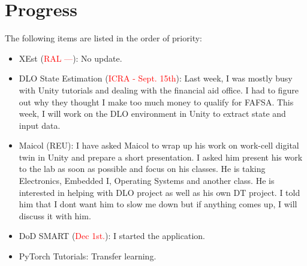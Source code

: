 \documentclass[11pt]{article}
\begin{document}
\section{Progress}
The following items are listed in the order of priority:
\begin{itemize}
    \item XEst (\textcolor{red}{RAL ---}): No update.


    \item DLO State Estimation (\textcolor{red}{ICRA - Sept. 15th}): Last week,
    I was mostly busy with Unity tutorials and dealing with the financial aid
    office. I had to figure out why they thought I make too much money to qualify
    for FAFSA.
    This week,
    I will work on the DLO environment \cite{yu2022shape} in Unity to extract
    state and input data.

    \item Maicol (REU): I have asked Maicol to wrap up his work on work-cell
    digital twin in Unity and prepare a short presentation. I asked him present
    his work to the lab as soon as possible and focus on his classes. He is
    taking Electronics, Embedded I, Operating Systems and another class. He is
    interested in helping with DLO project as well as his own DT project.
    I told him that I dont want him to slow me down but if anything comes up,
    I will discuss it with him.
    \item DoD SMART (\textcolor{red}{Dec 1st.}): I started the application.

    \item PyTorch Tutorials: Transfer learning.

  \end{itemize}


\newpage

\newpage


\end{document}
